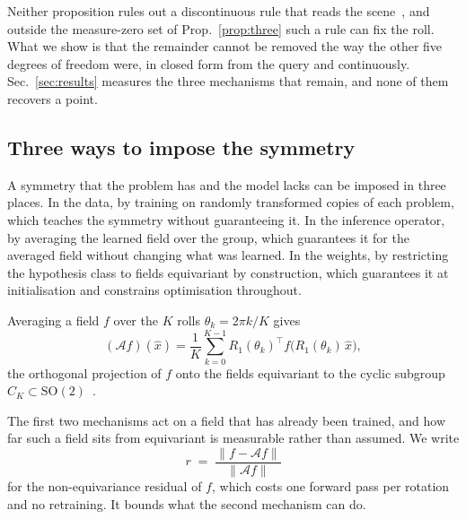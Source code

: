 \documentclass[10pt,twocolumn,letterpaper]{article}
\begin{document}
Neither proposition rules out a discontinuous rule that reads the
scene~\cite{kaba2023canon}, and outside the measure-zero set of
Prop.~\ref{prop:three} such a rule can fix the roll. What we show is that the
remainder cannot be removed the way the other five degrees of freedom were, in
closed form from the query and continuously. Sec.~\ref{sec:results} measures the
three mechanisms that remain, and none of them recovers a point.

\subsection{Three ways to impose the symmetry}
\label{sec:threeways}
A symmetry that the problem has and the model lacks can be imposed in three
places. In the data, by training on randomly transformed copies of each problem,
which teaches the symmetry without guaranteeing it. In the inference operator, by
averaging the learned field over the group, which guarantees it for the averaged
field without changing what was learned. In the weights, by restricting the
hypothesis class to fields equivariant by construction, which guarantees it at
initialisation and constrains optimisation throughout.

Averaging a field $f$ over the $K$ rolls $\theta_k = 2\pi k / K$ gives
\begin{equation}
  (\mathcal{A}f)(\hat{x}) = \frac{1}{K} \sum_{k=0}^{K-1}
  R_1(\theta_k)^{\top} f\big(R_1(\theta_k)\,\hat{x}\big) ,
  \label{eq:frame-averaging}
\end{equation}
the orthogonal projection of $f$ onto the fields equivariant to the cyclic
subgroup $C_K \subset \mathrm{SO}(2)$~\cite{puny2022fa}.

The first two mechanisms act on a field that has already been trained, and how
far such a field sits from equivariant is measurable rather than assumed. We
write
\begin{equation}
  r \;=\; \frac{\|f - \mathcal{A}f\|}{\|\mathcal{A}f\|}
  \label{eq:residual-def}
\end{equation}
for the non-equivariance residual of $f$, which costs one forward pass per
rotation and no retraining. It bounds what the second mechanism can do.
\end{document}
